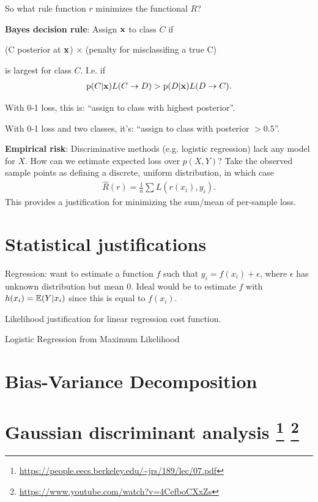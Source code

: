 \documentclass[12pt]{article}
\begin{document}
So what rule function $r$ minimizes the functional $R$?

\textbf{Bayes decision rule}: Assign $\mathbf x$ to class $C$ if

\begin{center}
(C posterior at $\mathbf x$) $\times$ (penalty for misclassifing a true C)
\end{center}

is largest for class $C$. I.e. if
\begin{align*}
  \operatorname{\text{p}}(C|\mathbf x)L(C \to D) > \operatorname{\text{p}}(D|\mathbf x)L(D \to C).
\end{align*}

With 0-1 loss, this is: ``assign to class with highest posterior''.

With 0-1 loss and two classes, it's: ``assign to class with posterior $> 0.5$''.

\textbf{Empirical risk}: Discriminative methods (e.g. logistic regression) lack
any model for $X$. How can we estimate expected loss over $p(X,Y)$? Take the
observed sample points as defining a discrete, uniform distribution, in which
case
\begin{align*}
  \hat R(r) = \frac{1}{n}\sum L(r(x_i), y_i).
\end{align*}
This provides a justification for minimizing the sum/mean of per-sample loss.

\newpage
\section{Statistical justifications}

Regression: want to estimate a function $f$ such that
$y_i = f(x_i) + \epsilon$, where $\epsilon$ has unknown distribution but mean
0. Ideal would be to estimate $f$ with $h(x_i) = \operatorname{\mathbb{E}}(Y|x_i)$ since this is equal
to $f(x_i)$.

Likelihood justification for linear regression cost function.

Logistic Regression from Maximum Likelihood

\section{Bias-Variance Decomposition}





\newpage
\section{Gaussian discriminant analysis
  \footnote{\url{https://people.eecs.berkeley.edu/~jrs/189/lec/07.pdf}}
  \footnote{\url{https://www.youtube.com/watch?v=4CefboCXxZs}}
}
\end{document}

